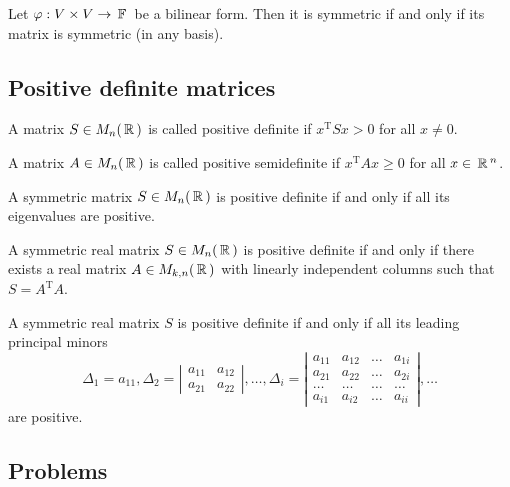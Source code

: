 \begin{lemma}
Let $\varphi: V \times V \to \,\mathbb{F}\,$ be a bilinear form. Then it is symmetric if and only if its matrix is symmetric (in any basis).
\end{lemma}

\subsection{Positive definite matrices}

\begin{definition}
A matrix $S\in M_n(\,\mathbb{R}\,)$ is called positive definite if $x^{\mathrm T} S x > 0$ for all $x \neq 0$.
\end{definition}

\begin{definition}
A matrix $A\in M_n(\,\mathbb{R}\,)$ is called positive semidefinite if $x^{\mathrm T} A x \geqslant 0$ for all $x \in\,\mathbb{R}\,^n$.
\end{definition}

\begin{lemma}
A symmetric matrix $S\in M_n(\,\mathbb{R}\,)$ is positive definite if and only if all its eigenvalues are positive.
\end{lemma}

\begin{lemma}
A symmetric real matrix $S\in M_n(\,\mathbb{R}\,)$ is positive definite if and only if there exists a real matrix $A\in M_{k,n}(\,\mathbb{R}\,)$ with linearly independent columns such that $S = A^{\mathrm T} A$.
\end{lemma}

\begin{lemma}
A symmetric real matrix $S$ is positive definite if and only if all its leading principal minors 
$$
\Delta_1=a_{11}, \Delta_2=\left|\begin{array}{ll}
    a_{11} & a_{12} \\
    a_{21} & a_{22}
    \end{array}\right|, \ldots, \Delta_i=\left|\begin{array}{cccc}
    a_{11} & a_{12} & \ldots & a_{1 i} \\
    a_{21} & a_{22} & \ldots & a_{2 i} \\
    \ldots & \ldots & \ldots & \ldots \\
    a_{i 1} & a_{i 2} & \ldots & a_{i i}
    \end{array}\right|, \ldots
$$
are positive.
\end{lemma}

\subsection{Problems}

